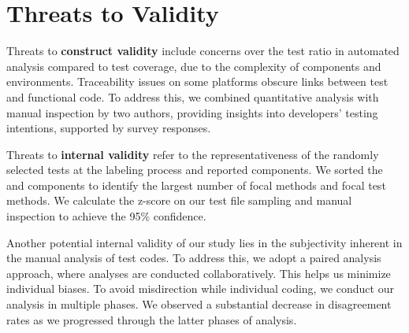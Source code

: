 \section{Threats to Validity}\label{sec:threats_validity}
Threats to \textbf{construct validity} include concerns over the test ratio in automated analysis compared to test coverage, due to the complexity of components and environments. Traceability issues on some platforms obscure links between test and functional code. To address this, we combined quantitative analysis with manual inspection by two authors, providing insights into developers' testing intentions, supported by survey responses.


Threats to \textbf{internal validity} refer to the representativeness of the randomly selected tests at the labeling process and reported components.  
We sorted the \addons and components to identify the largest number of focal methods and focal test methods. We calculate the z-score on our test file sampling and manual inspection to achieve the 95\% confidence.




Another potential internal validity of our study lies in the subjectivity inherent in the manual analysis of test codes. To address this, we adopt a paired analysis approach, where analyses are conducted collaboratively.  This helps us minimize individual biases. To avoid misdirection while individual coding, we conduct our analysis in multiple phases. We observed a substantial decrease in disagreement rates as we progressed through the latter phases of analysis.


